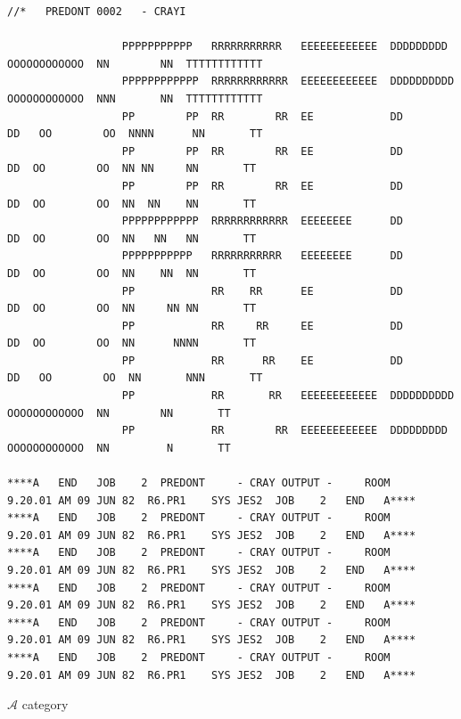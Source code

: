 {\fontsize{5}{6}\selectfont
\begin{verbatim}
//*   PREDONT 0002   - CRAYI

                  PPPPPPPPPPP   RRRRRRRRRRR   EEEEEEEEEEEE  DDDDDDDDD     OOOOOOOOOOOO  NN        NN  TTTTTTTTTTTT
                  PPPPPPPPPPPP  RRRRRRRRRRRR  EEEEEEEEEEEE  DDDDDDDDDD    OOOOOOOOOOOO  NNN       NN  TTTTTTTTTTTT
                  PP        PP  RR        RR  EE            DD       DD   OO        OO  NNNN      NN       TT
                  PP        PP  RR        RR  EE            DD        DD  OO        OO  NN NN     NN       TT
                  PP        PP  RR        RR  EE            DD        DD  OO        OO  NN  NN    NN       TT
                  PPPPPPPPPPPP  RRRRRRRRRRRR  EEEEEEEE      DD        DD  OO        OO  NN   NN   NN       TT
                  PPPPPPPPPPP   RRRRRRRRRRR   EEEEEEEE      DD        DD  OO        OO  NN    NN  NN       TT
                  PP            RR    RR      EE            DD        DD  OO        OO  NN     NN NN       TT
                  PP            RR     RR     EE            DD        DD  OO        OO  NN      NNNN       TT
                  PP            RR      RR    EE            DD       DD   OO        OO  NN       NNN       TT
                  PP            RR       RR   EEEEEEEEEEEE  DDDDDDDDDD    OOOOOOOOOOOO  NN        NN       TT
                  PP            RR        RR  EEEEEEEEEEEE  DDDDDDDDD     OOOOOOOOOOOO  NN         N       TT

****A   END   JOB    2  PREDONT     - CRAY OUTPUT -     ROOM        9.20.01 AM 09 JUN 82  R6.PR1    SYS JES2  JOB    2   END   A****
****A   END   JOB    2  PREDONT     - CRAY OUTPUT -     ROOM        9.20.01 AM 09 JUN 82  R6.PR1    SYS JES2  JOB    2   END   A****
****A   END   JOB    2  PREDONT     - CRAY OUTPUT -     ROOM        9.20.01 AM 09 JUN 82  R6.PR1    SYS JES2  JOB    2   END   A****
****A   END   JOB    2  PREDONT     - CRAY OUTPUT -     ROOM        9.20.01 AM 09 JUN 82  R6.PR1    SYS JES2  JOB    2   END   A****
****A   END   JOB    2  PREDONT     - CRAY OUTPUT -     ROOM        9.20.01 AM 09 JUN 82  R6.PR1    SYS JES2  JOB    2   END   A****
****A   END   JOB    2  PREDONT     - CRAY OUTPUT -     ROOM        9.20.01 AM 09 JUN 82  R6.PR1    SYS JES2  JOB    2   END   A****
\end{verbatim}
}


$\mathscr A$ category


